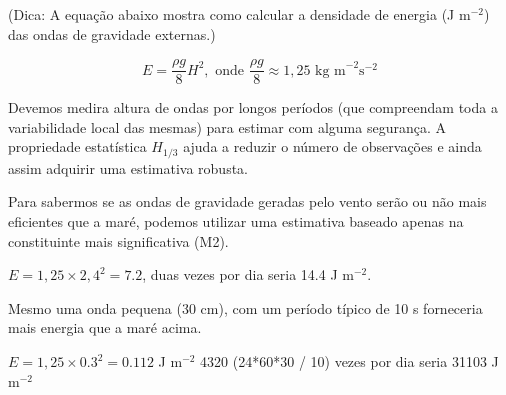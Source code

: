 \documentclass[letterpaper,portuguese,12pt,pdftex]{exam}
\begin{document}
\begin{questions}
(Dica: A equação abaixo mostra como calcular a densidade de energia (J m$^{-2}$) das ondas
de gravidade externas.)

\[
  E = \dfrac{\rho g}{8} H^2, \text{ onde } \dfrac{\rho g}{8} \approx 1,25 \text{ kg m}^{-2}\text{s}^{-2}
\]

\begin{solution}
  Devemos medira altura de ondas por longos períodos (que compreendam toda a
  variabilidade local das mesmas) para estimar com alguma segurança.  A
  propriedade estatística $H_{1/3}$ ajuda a reduzir o número de observações e
  ainda assim adquirir uma estimativa robusta.

  Para sabermos se as ondas de gravidade geradas pelo vento serão ou não mais
  eficientes que a maré, podemos utilizar uma estimativa baseado apenas na
  constituinte mais significativa (M2).

  $E = 1,25 \times 2,4^2 = 7.2$, duas vezes por dia seria 14.4 J m$^{-2}$.

  Mesmo uma onda pequena (30 cm), com um período típico de 10 s forneceria mais
  energia que a maré acima.

  $E = 1,25 \times 0.3^2 = 0.112$ J m$^{-2}$ 4320 (24*60*30 / 10) vezes por dia
  seria 31103 J m$^{-2}$
\end{solution}

\end{questions}
\end{document}
